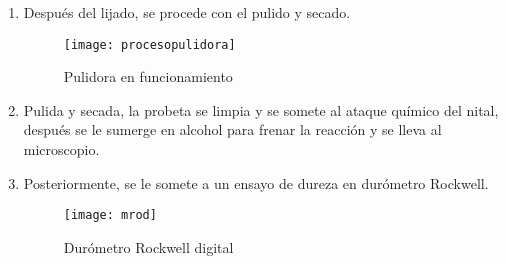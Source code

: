 \documentclass[a4paper,12pt]{report}
\begin{document}
\begin{enumerate}
\newpage
\item Después del lijado, se procede con el pulido y secado.
\begin{figure}[H]
\begin{center}
\texttt{[image: procesopulidora]}
\end{center}
\caption{Pulidora en funcionamiento}
\end{figure}
\item Pulida y secada, la probeta se limpia y se somete al ataque químico del nital, después se le sumerge en alcohol para frenar la reacción y se lleva al microscopio.
\item Posteriormente, se le somete a un ensayo de dureza en durómetro Rockwell.
\begin{figure}[H]
\begin{center}
\texttt{[image: mrod]}
\end{center}
\caption{Durómetro Rockwell digital}
\end{figure}
\end{enumerate}
\end{document}
